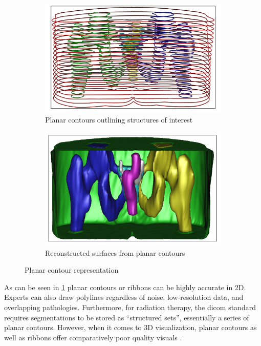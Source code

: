 \begin{figure}[h]
	\begin{subfigure}{0.49\textwidth}
		\includegraphics[scale=0.5]{images/planarContours.png}
		\caption{Planar contours outlining structures of interest \cite{weinsteinScanlineSurfacingBuilding2000}}\label{fig:planarContoursLines}
	\end{subfigure}
	\begin{subfigure}{0.49\textwidth}
		\includegraphics[scale=0.5]{images/planarContoursRecon.png}
		\caption{Reconstructed surfaces from planar contours \cite{weinsteinScanlineSurfacingBuilding2000}}\label{fig:planarRec}
	\end{subfigure}
	\caption{Planar contour representation}\label{fig:planarContours}
\end{figure}

\noindent
As can be seen in \cref{fig:planarContoursLines} planar contours or ribbons can be highly accurate in 2D.
Experts can also draw polylines regardless of noise, low-resolution data, and overlapping pathologies.
Furthermore, for radiation therapy, the \gls{dicom} standard requires segmentations to be stored as ``structured sets'',
essentially a series of planar contours.
However, when it comes to 3D visualization, planar contours as well as ribbons offer comparatively poor quality visuals \cite{pinterPolymorphSegmentationRepresentation2019,weinsteinScanlineSurfacingBuilding2000}.


